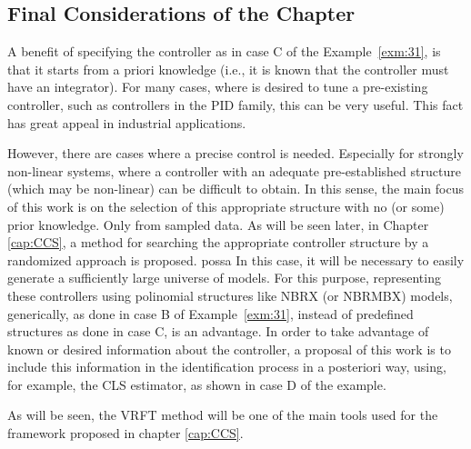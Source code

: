 \subsection{ Final Considerations of the Chapter }%
\label{sub:considerações_finais}

A benefit of specifying the controller as in case C of the Example~\ref{exm:31}, is that it starts from a priori knowledge (i.e., it is known that the controller must have an integrator). For many cases, where is desired to tune a pre-existing controller, such as controllers in the PID family, this can be very useful. This fact has great appeal in industrial applications.

However, there are cases where a precise control is needed. Especially for strongly non-linear systems, where a controller with an adequate pre-established structure (which may be non-linear) can be difficult to obtain.
In this sense, the main focus of this work is on the selection of this appropriate structure with no (or some) prior knowledge. Only from sampled data. As will be seen later, in Chapter \ref{cap:CCS}, a method for searching the appropriate controller structure by a randomized approach is proposed.
possa
In this case, it will be necessary to easily generate a sufficiently large universe of models.
For this purpose, representing these controllers using polinomial structures like NBRX (or NBRMBX) models, generically, as done in case B of Example~\ref{exm:31}, instead of predefined structures as done in case C, is an advantage.
In order to take advantage of known or desired information about the controller, a proposal of this work is to include this information in the  identification process in a posteriori way, using, for example, the CLS estimator, as shown in case D of the example.

As will be seen, the VRFT method will be one of the main tools used for the framework proposed in chapter \ref{cap:CCS}.

